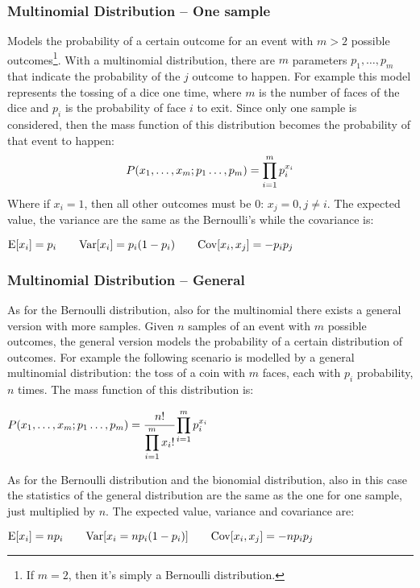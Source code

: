 \subsubsection{Multinomial Distribution -- One sample}
Models the probability of a certain outcome for an event with $m>2$ possible outcomes\footnote{If $m=2$, then it's simply a Bernoulli distribution.}. \newline
With a multinomial distribution, there are $m$ parameters $p_1, \hdots, p_m$ that indicate the probability of the $j$ outcome to happen. \newline
For example this model represents the tossing of a dice one time, where $m$ is the number of faces of the dice and $p_i$ is the probability of face $i$ to exit. \newline
Since only one sample is considered, then the mass function of this distribution becomes the probability of that event to happen:
\begin{equation}
	P(x_1,\hdots,x_m;p_1\hdots,p_m)=\displaystyle\prod_{i=1}^mp_i^{x_i}
	\label{eq:MultinomialMassFunction}
\end{equation}
Where if $x_i=1$, then all other outcomes must be 0: $x_j=0, j\neq i$. 
The expected value, the variance are the same as the Bernoulli's while the covariance is:
\begin{center}
	$\displaystyle \text{E}[x_i]=p_i\qquad \text{Var}[x_i]=p_i(1-p_i)\qquad \text{Cov}[x_i, x_j]=-p_ip_j$
\end{center}
%
\subsubsection{Multinomial Distribution -- General}
As for the Bernoulli distribution, also for the multinomial there exists a general version with more samples.\newline
Given $n$ samples of an event with $m$ possible outcomes, the general version models the probability of a certain distribution of outcomes. \newline
For example the following scenario is modelled by a general multinomial distribution: the toss of a coin with $m$ faces, each with $p_i$ probability, $n$ times. \newline
The mass function of this distribution is:
\begin{center}
	$\displaystyle P(x_1,\hdots,x_m;p_1\hdots,p_m)=\cfrac{n!}{\displaystyle\prod_{i=1}^mx_i!}\displaystyle\prod_{i=1}^mp_i^{x_i}$
\end{center}
As for the Bernoulli distribution and the bionomial distribution, also in this case the statistics of the general distribution are the same as the one for one sample, just multiplied by $n$. The expected value, variance and covariance are:
\begin{center}
	$\displaystyle \text{E}[x_i]=np_i\qquad \text{Var}[{x_i}=np_i(1-p_i)]\qquad\text{Cov}[x_i,x_j]=-np_ip_j$
\end{center}
%
%
%
